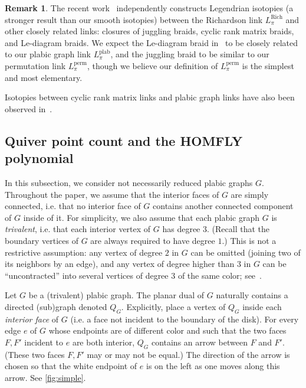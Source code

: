 \documentclass[11pt]{article}
\theoremstyle{definition}
\newtheorem{remark}[theo]{Remark}
\numberwithin{equation}{section}
\newcommand\perm{\operatorname{perm}}
\newcommand\Lperm{L^{\perm}}
\newcommand\rich{\operatorname{Rich}}
\newcommand\Lrich{L^{\rich}}
\newcommand\plab{\operatorname{plab}}
\newcommand\Lplab{L^{\plab}}
\newcommand\fp{\pi}
\newcommand\QG{Q_G}
\begin{document}
%
%
%

%

%


\begin{remark}
The recent work~\cite{CGGS} independently constructs Legendrian isotopies (a stronger result than our smooth isotopies) between the Richardson link $\Lrich_\pi$ and other closely related links: closures of juggling braids, cyclic rank matrix braids, and Le-diagram braids.  We expect the Le-diagram braid in~\cite{CGGS} to be closely related to our plabic graph link $\Lplab_\fp$, and the juggling braid to be similar to our permutation link $\Lperm_\fp$, though we believe our definition of $\Lperm_\fp$ is the simplest and most elementary.

Isotopies between cyclic rank matrix links and plabic graph links have also been observed in~\cite{STWZ}.
%
%
\end{remark}

\subsection{Quiver point count and the HOMFLY polynomial}\label{sec:intro:quivers-point-count}
In this subsection, we consider not necessarily reduced plabic graphs $G$. Throughout the paper, we assume that the interior faces of $G$ are simply connected, i.e.  that no interior face of $G$ contains another connected component of $G$ inside of it. For simplicity, we also assume that each plabic graph $G$ is \emph{trivalent}, i.e.  that each interior vertex of $G$ has degree $3$. (Recall that the boundary vertices of $G$ are always required to have degree $1$.) This is not a restrictive assumption: any vertex of degree $2$ in $G$ can be omitted (joining two of its neighbors by an edge), and any vertex of degree higher than $3$ in $G$ can be ``uncontracted'' into several vertices of degree $3$ of the same color; see~\cite[Figure~12.2]{Pos}.
%
%
%
%

Let $G$ be a (trivalent) plabic graph. The planar dual of $G$ naturally contains a directed (sub)graph denoted $\QG$. Explicitly, place a vertex of $\QG$ inside each \emph{interior face} of $G$ (i.e.  a face not incident to the boundary of the disk). For every edge $e$ of $G$ whose endpoints are of different color and such that the two faces $F,F'$ incident to $e$ are both interior, $\QG$ contains an arrow between $F$ and $F'$. (These two faces $F,F'$ may or may not be equal.) The direction of the arrow is chosen so that the white endpoint of $e$ is on the left as one moves along this arrow. See \cref{fig:simple}.
\end{document}
